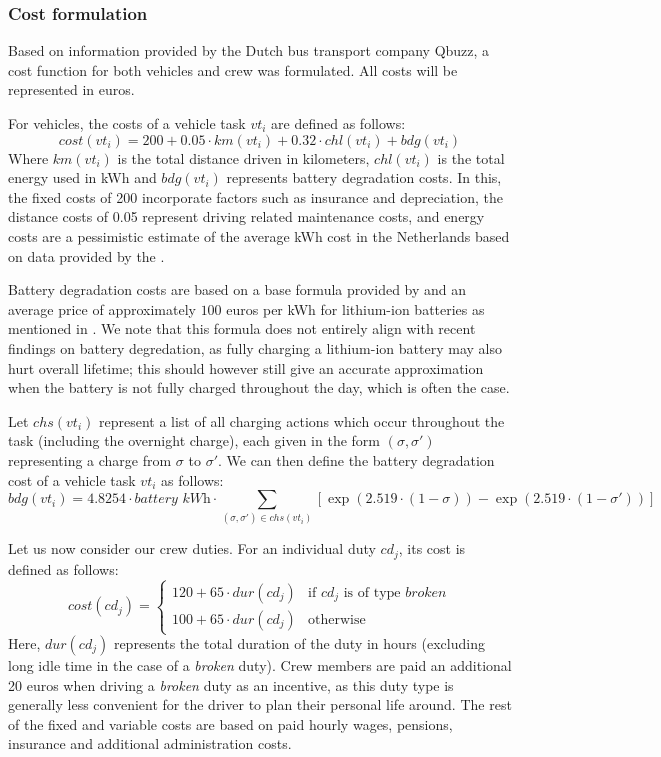 \documentclass[]{article}
\begin{document}
\subsubsection{Cost formulation}
Based on information provided by the Dutch bus transport company Qbuzz, a cost function for both vehicles and crew was formulated. All costs will be represented in euros. 

For vehicles, the costs of a vehicle task $vt_i$ are defined as follows:
\begin{equation}
cost(vt_i) = 200 + 0.05 \cdot km(vt_i) + 0.32 \cdot chl(vt_i) + bdg(vt_i)  \nonumber
\end{equation}
Where $km(vt_i)$ is the total distance driven in kilometers, $chl(vt_i)$ is the total energy used in kWh and $bdg(vt_i)$ represents battery degradation costs. In this, the fixed costs of 200 incorporate factors such as insurance and depreciation, the distance costs of 0.05 represent driving related maintenance costs, and energy costs are a pessimistic estimate of the average kWh cost in the Netherlands based on data provided by the \citet{ANWB2025}.

Battery degradation costs are based on a base formula provided by \citet{vanKootenNiekerk2017} and an average price of approximately $100$ euros per kWh for lithium-ion batteries as mentioned in \citet{Ocatsaros2024}. We note that this formula does not entirely align with recent findings on battery degredation, as fully charging a lithium-ion battery may also hurt overall lifetime; this should however still give an accurate approximation when the battery is not fully charged throughout the day, which is often the case. 

Let $chs(vt_i)$ represent a list of all charging actions which occur throughout the task (including the overnight charge), each given in the form $(\sigma, \sigma')$ representing a charge from $\sigma$ to $\sigma'$. We can then define the battery degradation cost of a vehicle task $vt_i$ as follows:
\begin{equation}
  bdg(vt_i) = 4.8254 \cdot \textit{battery kWh} \cdot \sum_{(\sigma, \sigma') \in chs(vt_i)} [\exp(2.519 \cdot (1 - \sigma)) - \exp(2.519 \cdot (1 - \sigma'))] \nonumber
\end{equation}

\noindent Let us now consider our crew duties. For an individual duty $cd_j$, its cost is defined as follows:
\begin{equation}
  cost(cd_j) =
  \begin{cases}
    120 + 65 \cdot dur(cd_j) & \text{if } cd_j \text{ is of type }\textit{broken} \\ 
    100 + 65 \cdot dur(cd_j) & \text{otherwise}
  \end{cases} \nonumber
\end{equation}
Here, $dur(cd_j)$ represents the total duration of the duty in hours (excluding long idle time in the case of a \textit{broken} duty). Crew members are paid an additional 20 euros when driving a \textit{broken} duty as an incentive, as this duty type is generally less convenient for the driver to plan their personal life around. The rest of the fixed and variable costs are based on paid hourly wages, pensions, insurance and additional administration costs.
\end{document}
